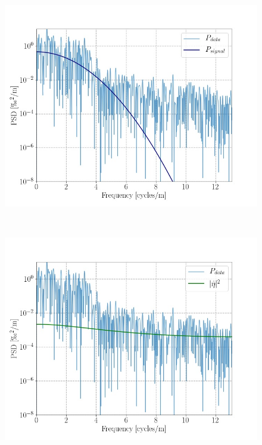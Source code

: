 \documentclass[../../CompleteThesis/Complete_1stDraft.tex]{subfiles}
\begin{document}
\begin{marginfigure}
	\centering
	\begin{subfigure}{\marginparwidth}
		\centering
		\includegraphics[width=\textwidth]{SiteA_PSD_sig.jpg}
		\caption{\footnotesize}
		\label{fig:SiteA_PSD_sig}
	\end{subfigure}\\[1ex]
	
	\begin{subfigure}{\marginparwidth}
		\centering
		\includegraphics[width=\textwidth]{SiteA_PSD_noise.jpg}
		\caption{\footnotesize}
		\label{fig:SiteA_PSD_noise}
	\end{subfigure}\\[1ex]
	

\end{marginfigure}
\end{document}
